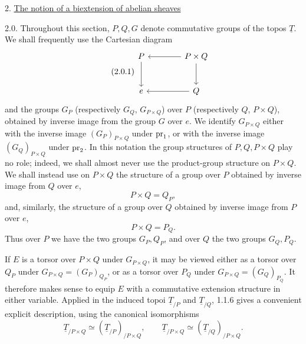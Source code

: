 
2. \underline{The notion of a biextension of abelian sheaves}

2.0. Throughout this section, $P,Q,G$ denote commutative groups of the
topos $\underline T$. We shall frequently use the Cartesian diagram
\begin{equation}\tag{2.0.1}
\begin{tikzcd}[column sep=4em,row sep=2.6em]
 P \arrow[d] & P\times Q \arrow[l] \arrow[d] \\
 e & Q \arrow[l]
\end{tikzcd}
\end{equation}
and the groups $G_P$ (respectively $G_Q$, $G_{P\times Q}$) over $P$
(respectively $Q$, $P\times Q$), obtained by inverse image from the
group $G$ over $e$. We identify $G_{P\times Q}$ either with the inverse
image $(G_P)_{P\times Q}$ under $\operatorname{pr}_1$, or with the inverse image
$(G_Q)_{P\times Q}$ under $\operatorname{pr}_2$. In this notation the group
structures of $P,Q,P\times Q$ play no role; indeed, we shall almost
never use the product-group structure on $P\times Q$. We shall instead
use on $P\times Q$ the structure of a group over $P$ obtained by inverse
image from $Q$ over $e$,
\begin{equation}\tag{2.0.2}
 P\times Q=Q_P,
\end{equation}
and, similarly, the structure of a group over $Q$ obtained by inverse
image from $P$ over $e$,
\begin{equation}\tag{2.0.3}
 P\times Q=P_Q.
\end{equation}
Thus over $P$ we have the two groups $G_P,Q_P$, and over $Q$ the two
groups $G_Q,P_Q$.

If $E$ is a torsor over $P\times Q$ under $G_{P\times Q}$, it may be
viewed either as a torsor over $Q_P$ under
$G_{P\times Q}=(G_P)_{Q_P}$, or as a torsor over $P_Q$ under
$G_{P\times Q}=(G_Q)_{P_Q}$. It therefore makes sense to equip $E$ with
a commutative extension structure in either variable. Applied in the
induced topoi $\underline T_{/P}$ and $\underline T_{/Q}$, 1.1.6 gives
a convenient explicit description, using the canonical isomorphisms
\[
 \underline T_{/P\times Q}\simeq
 (\underline T_{/P})_{/P\times Q},\qquad
 \underline T_{/P\times Q}\simeq
 (\underline T_{/Q})_{/P\times Q}.
\]

